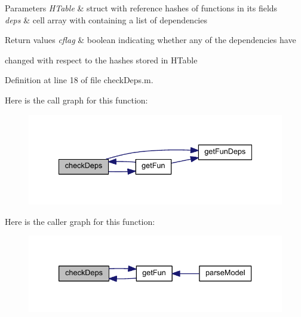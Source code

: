 \begin{DoxyParams}{Parameters}
{\em H\+Table} & struct with reference hashes of functions in its fields\\
\hline
{\em deps} & cell array with containing a list of dependencies\\
\hline
\end{DoxyParams}

\begin{DoxyRetVals}{Return values}
{\em cflag} & boolean indicating whether any of the dependencies have\\
\hline
\end{DoxyRetVals}
changed with respect to the hashes stored in H\+Table 

Definition at line 18 of file check\+Deps.\+m.



Here is the call graph for this function\+:\nopagebreak
\begin{figure}[H]
\begin{center}
\leavevmode
\includegraphics[width=335pt]{classamimodel_aa04dcfc1d2188cae948a75ebd46a6e03_cgraph}
\end{center}
\end{figure}




Here is the caller graph for this function\+:\nopagebreak
\begin{figure}[H]
\begin{center}
\leavevmode
\includegraphics[width=333pt]{classamimodel_aa04dcfc1d2188cae948a75ebd46a6e03_icgraph}
\end{center}
\end{figure}


\hypertarget{classamimodel_ab21f46296b0ee0a141c38143a79ad396}{}

